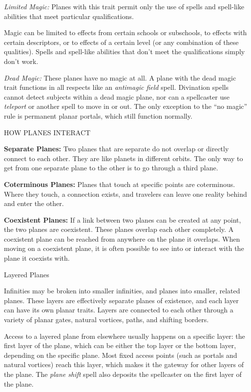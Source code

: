 \documentclass{article}
\begin{document}
\textit{Limited Magic:} Planes with this trait permit only the use of spells and 
spell-like abilities that meet particular qualifications.

Magic can be limited to effects from certain schools or subschools, to effects 
with certain descriptors, or to effects of a certain level (or any combination 
of these qualities). Spells and spell-like abilities that don't meet the qualifications 
simply don't work.

\textit{Dead Magic: }These planes have no magic at all. A plane with the dead magic 
trait functions in all respects like an \textit{antimagic field }spell. Divination 
spells cannot detect subjects within a dead magic plane, nor can a spellcaster 
use \textit{teleport }or another spell to move in or out. The only exception to 
the ``no magic'' rule is permanent planar portals, which still function normally.

\vspace{12pt}
HOW PLANES INTERACT

\textbf{Separate Planes:} Two planes that are separate do not overlap or directly 
connect to each other. They are like planets in different orbits. The only way 
to get from one separate plane to the other is to go through a third plane.

\textbf{Coterminous Planes:} Planes that touch at specific points are coterminous. 
Where they touch, a connection exists, and travelers can leave one reality behind 
and enter the other.

\textbf{Coexistent Planes:} If a link between two planes can be created at any 
point, the two planes are coexistent. These planes overlap each other completely. 
A coexistent plane can be reached from anywhere on the plane it overlaps. When 
moving on a coexistent plane, it is often possible to see into or interact with 
the plane it coexists with. 

\vspace{12pt}
Layered Planes

Infinities may be broken into smaller infinities, and planes into smaller, related 
planes. These layers are effectively separate planes of existence, and each layer 
can have its own planar traits. Layers are connected to each other through a variety 
of planar gates, natural vortices, paths, and shifting borders.

Access to a layered plane from elsewhere usually happens on a specific layer: the 
first layer of the plane, which can be either the top layer or the bottom layer, 
depending on the specific plane. Most fixed access points (such as portals and 
natural vortices) reach this layer, which makes it the gateway for other layers 
of the plane. The \textit{plane shift }spell also deposits the spellcaster on the 
first layer of the plane.
\end{document}
